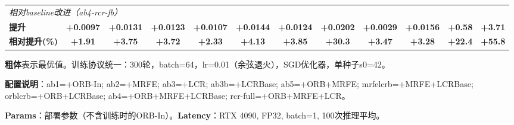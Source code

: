 \begin{table}[t]
\begin{tabular}{l|ccc|ccc|ccc|cc}
\hline
\hline
\multicolumn{12}{l}{\textit{相对baseline改进（ab4-rcr-fb）}} \\
\textbf{提升} & \textbf{+0.0097} & \textbf{+0.0131} & \textbf{+0.0123} & \textbf{+0.0107} & \textbf{+0.0144} & \textbf{+0.0124} & \textbf{+0.0202} & \textbf{+0.0029} & \textbf{+0.0156} & \textbf{+0.58} & \textbf{+3.71} \\
\textbf{相对提升(\%)} & \textbf{+1.91} & \textbf{+3.75} & \textbf{+3.72} & \textbf{+2.33} & \textbf{+4.13} & \textbf{+3.85} & \textbf{+30.3} & \textbf{+3.47} & \textbf{+3.28} & \textbf{+22.4} & \textbf{+55.8} \\
\hline
\end{tabular}
\begin{tablenotes}
\small
\item \textbf{粗体}表示最优值。训练协议统一：300轮，batch=64，lr=0.01（余弦退火），SGD优化器，单种子s0=42。
\item \textbf{配置说明}：ab1=+ORB-In; ab2=+MRFE; ab3=+LCR; ab3b=+LCRBase; ab5=+ORB+MRFE; mrfelcrb=+MRFE+LCRBase; orblcrb=+ORB+LCRBase; ab4=+ORB+MRFE+LCRBase; rcr-full=+ORB+MRFE+LCR。
\item \textbf{Params}：部署参数（不含训练时的ORB-In）。\textbf{Latency}：RTX 4090, FP32, batch=1, 100次推理平均。
\end{tablenotes}
\end{table}
